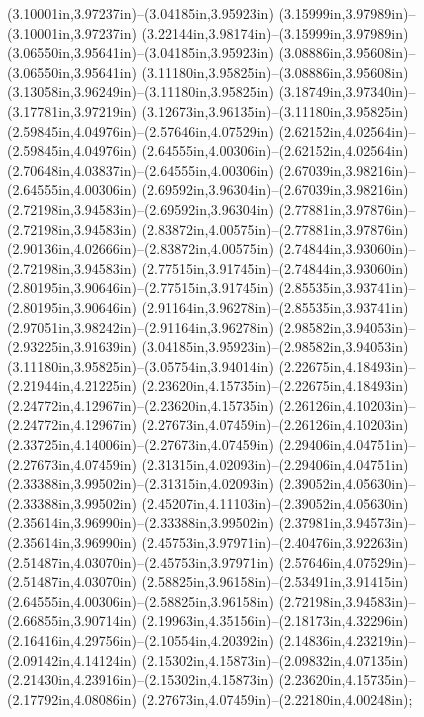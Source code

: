 (3.10001in,3.97237in)--(3.04185in,3.95923in) (3.15999in,3.97989in)--(3.10001in,3.97237in) (3.22144in,3.98174in)--(3.15999in,3.97989in) (3.06550in,3.95641in)--(3.04185in,3.95923in) (3.08886in,3.95608in)--(3.06550in,3.95641in) (3.11180in,3.95825in)--(3.08886in,3.95608in) (3.13058in,3.96249in)--(3.11180in,3.95825in) (3.18749in,3.97340in)--(3.17781in,3.97219in) (3.12673in,3.96135in)--(3.11180in,3.95825in) (2.59845in,4.04976in)--(2.57646in,4.07529in) (2.62152in,4.02564in)--(2.59845in,4.04976in) (2.64555in,4.00306in)--(2.62152in,4.02564in) (2.70648in,4.03837in)--(2.64555in,4.00306in) (2.67039in,3.98216in)--(2.64555in,4.00306in) (2.69592in,3.96304in)--(2.67039in,3.98216in) (2.72198in,3.94583in)--(2.69592in,3.96304in) (2.77881in,3.97876in)--(2.72198in,3.94583in) (2.83872in,4.00575in)--(2.77881in,3.97876in) (2.90136in,4.02666in)--(2.83872in,4.00575in) (2.74844in,3.93060in)--(2.72198in,3.94583in) (2.77515in,3.91745in)--(2.74844in,3.93060in) (2.80195in,3.90646in)--(2.77515in,3.91745in) (2.85535in,3.93741in)--(2.80195in,3.90646in) (2.91164in,3.96278in)--(2.85535in,3.93741in) (2.97051in,3.98242in)--(2.91164in,3.96278in) (2.98582in,3.94053in)--(2.93225in,3.91639in) (3.04185in,3.95923in)--(2.98582in,3.94053in) (3.11180in,3.95825in)--(3.05754in,3.94014in) (2.22675in,4.18493in)--(2.21944in,4.21225in) (2.23620in,4.15735in)--(2.22675in,4.18493in) (2.24772in,4.12967in)--(2.23620in,4.15735in) (2.26126in,4.10203in)--(2.24772in,4.12967in) (2.27673in,4.07459in)--(2.26126in,4.10203in) (2.33725in,4.14006in)--(2.27673in,4.07459in) (2.29406in,4.04751in)--(2.27673in,4.07459in) (2.31315in,4.02093in)--(2.29406in,4.04751in) (2.33388in,3.99502in)--(2.31315in,4.02093in) (2.39052in,4.05630in)--(2.33388in,3.99502in) (2.45207in,4.11103in)--(2.39052in,4.05630in) (2.35614in,3.96990in)--(2.33388in,3.99502in) (2.37981in,3.94573in)--(2.35614in,3.96990in) (2.45753in,3.97971in)--(2.40476in,3.92263in) (2.51487in,4.03070in)--(2.45753in,3.97971in) (2.57646in,4.07529in)--(2.51487in,4.03070in) (2.58825in,3.96158in)--(2.53491in,3.91415in) (2.64555in,4.00306in)--(2.58825in,3.96158in) (2.72198in,3.94583in)--(2.66855in,3.90714in) (2.19963in,4.35156in)--(2.18173in,4.32296in) (2.16416in,4.29756in)--(2.10554in,4.20392in) (2.14836in,4.23219in)--(2.09142in,4.14124in) (2.15302in,4.15873in)--(2.09832in,4.07135in) (2.21430in,4.23916in)--(2.15302in,4.15873in) (2.23620in,4.15735in)--(2.17792in,4.08086in) (2.27673in,4.07459in)--(2.22180in,4.00248in);
